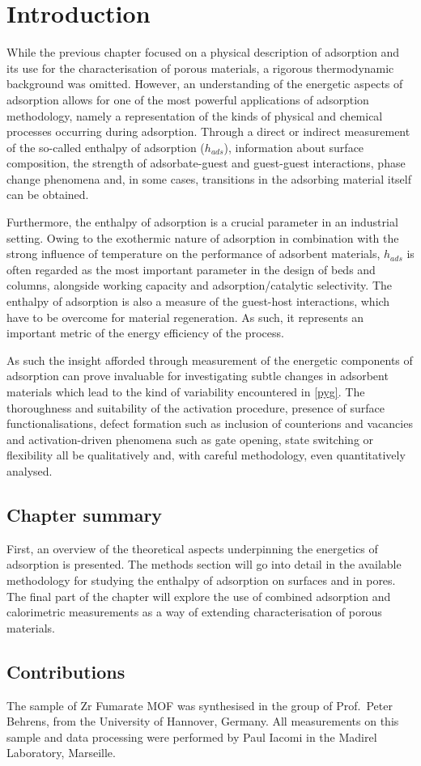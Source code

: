 
\section{Introduction}

While the previous chapter focused on a physical description
of adsorption and its use for the characterisation of 
porous materials, a rigorous thermodynamic background
was omitted. However, an understanding of the energetic
aspects of adsorption allows for one of the most powerful
applications of adsorption methodology, namely a representation
of the kinds of physical and chemical processes occurring 
during adsorption. Through a direct or indirect measurement
of the so-called enthalpy of adsorption (\(h_{ads}\)),
information about surface composition, the strength of 
adsorbate-guest and guest-guest interactions, phase change
phenomena and, in some cases, transitions in the 
adsorbing material itself can be obtained.

Furthermore, the enthalpy of adsorption is a crucial parameter
in an industrial setting. Owing to the exothermic nature of
adsorption in combination with the strong influence of temperature
on the performance of adsorbent materials, \(h_{ads}\) is
often regarded as the most important parameter in the 
design of beds and columns, alongside working capacity and 
adsorption/catalytic selectivity. The enthalpy of adsorption
is also a measure of the guest-host interactions, which
have to be overcome for material regeneration. As such, it 
represents an important metric of the energy efficiency 
of the process.

As such the insight afforded through measurement of 
the energetic components of adsorption can prove invaluable
for investigating subtle changes in adsorbent materials
which lead to the kind of variability encountered in 
\autoref{pyg}. The thoroughness and suitability of the activation
procedure, presence of surface functionalisations, defect 
formation such as inclusion of counterions and vacancies
and activation-driven phenomena such as gate opening,
state switching or flexibility all be qualitatively and,
with careful methodology, even quantitatively analysed.

\subsection*{Chapter summary}

First, an overview of the theoretical aspects underpinning 
the energetics of adsorption is presented. The methods 
section will go into detail in the available methodology
for studying the enthalpy of adsorption on surfaces and in 
pores. The final part of the chapter will explore the use
of combined adsorption and calorimetric measurements
as a way of extending characterisation of porous materials.

\subsection*{Contributions}

The sample of Zr Fumarate MOF was synthesised in the group
of Prof.\ Peter Behrens, from the University of Hannover, 
Germany. All measurements on this sample and data processing were
performed by Paul Iacomi in the Madirel Laboratory, Marseille.